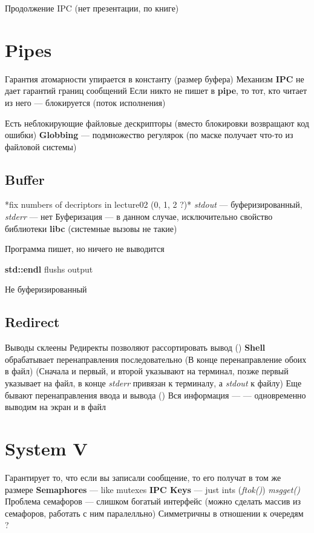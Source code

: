 Продолжение IPC (нет презентации, по книге)

\section{Pipes}
Гарантия атомарности упирается в константу (размер буфера)
Механизм \textbf{IPC} не дает гарантий границ сообщений
Если никто не пишет в \textbf{pipe}, то тот, кто читает из него --- блокируется (поток исполнения)

Есть неблокирующие файловые дескрипторы (вместо блокировки возвращают код ошибки)
\textbf{Globbing} --- подмножество регулярок (по маске получает что-то из файловой системы)

\subsection{Buffer}
*fix numbers of decriptors in lecture02 (0, 1, 2 ?)*
\emph{stdout} --- буферизированный, \emph{stderr} --- нет
Буферизация --- в данном случае, исключительно свойство библиотеки \textbf{libc} (системные вызовы не такие)

Программа пишет, но ничего не выводится

\textbf{std::endl} flushs output

Не буферизированный

\subsection{Redirect}
Выводы склеены
Редиректы позволяют рассортировать вывод ()
\textbf{Shell} обрабатывает перенаправления последовательно
 (В конце перенаправление обоих в файл)
 (Сначала и первый, и второй указывают на терминал, позже первый указывает на файл, в конце \emph{stderr} привязан к терминалу, а \emph{stdout} к файлу)
Еще бывают перенаправления ввода и вывода ()
Вся информация --- 
 --- одновременно выводим на экран и в файл

\section{System V}
Гарантирует то, что если вы записали сообщение, то его получат в том же размере
\textbf{Semaphores} --- like mutexes
\textbf{IPC Keys} --- just ints (\emph{ftok()})
\emph{msgget()}
Проблема семафоров --- слишком богатый интерфейс (можно сделать массив из семафоров, работать с ним паралелльно)
Симметричны в отношении к очередям ?

